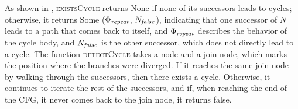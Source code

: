 \documentclass[acmsmall,screen,review,anonymous,nonacm]{acmart}
\begin{document}

As shown in , \textsc{existsCycle}  
returns None if none of its successors leads to cycles; otherwise, it returns Some (${\mathrm{\Phi}}_{\mathit{repeat}}$, $N_{\mathit{false}}$),  indicating that one successor of $N$ leads to a path that comes back to itself, and ${\mathrm{\Phi}}_{\mathit{repeat}}$ describes the behavior of the cycle body, 
and $N_{\mathit{false}}$ is the other successor, which does not directly lead to a cycle. 
The function \textsc{detectCycle} takes a node and a join node, which marks the position where the branches were diverged.
If it reaches the same join node by walking through the successors, then there exists a cycle. Otherwise, it continues to iterate the rest of the successors, and if, when reaching the end of the CFG, it never comes back to the join node, it returns false. 
\end{document}
